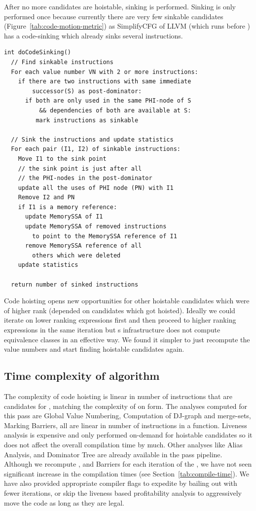 \documentclass[sigplan,10pt,review,anonymous]{acmart}\settopmatter{printfolios=true,printccs=false,printacmref=false}
\begin{document}
After no more candidates are hoistable, sinking is performed. Sinking is only
performed once because currently there are very few sinkable candidates
(Figure~\ref{tab:code-motion-metric}) as SimplifyCFG of LLVM (which runs before
\GCM{}) has a code-sinking which already sinks several instructions.

\begin{verbatim}
int doCodeSinking()
  // Find sinkable instructions
  For each value number VN with 2 or more instructions:
    if there are two instructions with same immediate
        successor(S) as post-dominator:
      if both are only used in the same PHI-node of S
          && dependencies of both are available at S:
         mark instructions as sinkable

  // Sink the instructions and update statistics
  For each pair (I1, I2) of sinkable instructions:
    Move I1 to the sink point
    // the sink point is just after all
    // the PHI-nodes in the post-dominator
    update all the uses of PHI node (PN) with I1
    Remove I2 and PN
    if I1 is a memory reference:
      update MemorySSA of I1
      update MemorySSA of removed instructions
        to point to the MemorySSA reference of I1
      remove MemorySSA reference of all
        others which were deleted
    update statistics

  return number of sinked instructions
\end{verbatim}

Code hoisting opens new opportunities for other hoistable candidates which were
of higher rank (depended on candidates which got hoisted). Ideally we could
iterate on lower ranking expressions first and then proceed to higher ranking
expressions in the same iteration but s \GVN{} infrastructure does not
compute equivalence classes in an effective way. We found it simpler to just
recompute the value numbers and start finding hoistable candidates again.

\subsection{Time complexity of algorithm}
The complexity of code hoisting is linear in number of instructions that are
candidates for \gcm{}, matching the complexity of \PRE{} on \SSA{} form.
The analyses computed for this pass are Global Value Numbering, Computation of
DJ-graph and merge-sets, Marking Barriers, all are linear in number of
instructions in a function. Liveness analysis is expensive and only performed
on-demand for hoistable candidates so it does not affect the overall compilation
time by much. Other analyses like Alias Analysis, \MemorySSA{} and Dominator Tree
are already available in the \LLVM{} pass pipeline. Although we recompute \GVN{}, and
Barriers for each iteration of the \gcm{}, we have not seen significant
increase in the compilation times (see Section~\ref{tab:compile-time}). We have also
provided appropriate compiler
flags to expedite \gcm{} by bailing out with fewer iterations, or skip the
liveness based profitability analysis to aggressively move the code as long as
they are legal.
\end{document}
